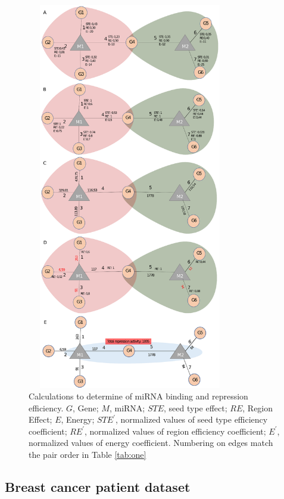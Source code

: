 \documentclass[a4,center,fleqn]{NAR}
\begin{document}
\begin{figure}[ht]
\begin{center}
\includegraphics[width=9cm,height=17cm]{fig2_new.eps}
\end{center}
\caption{Calculations to determine of miRNA binding and repression efficiency. $G$, Gene; $M$, miRNA; $STE$, seed type effect; $RE$, Region Effect; $E$, Energy; $STE^\prime$, normalized values of seed type efficiency coefficient; $RE^\prime$, normalized values of region efficiency coefficient; $E^\prime$, normalized values of energy coefficient. Numbering on edges match the pair order in Table \ref{tab:one} }
\label{fig:fig2}
\end{figure}

\subsection{Breast cancer patient dataset}
\end{document}
